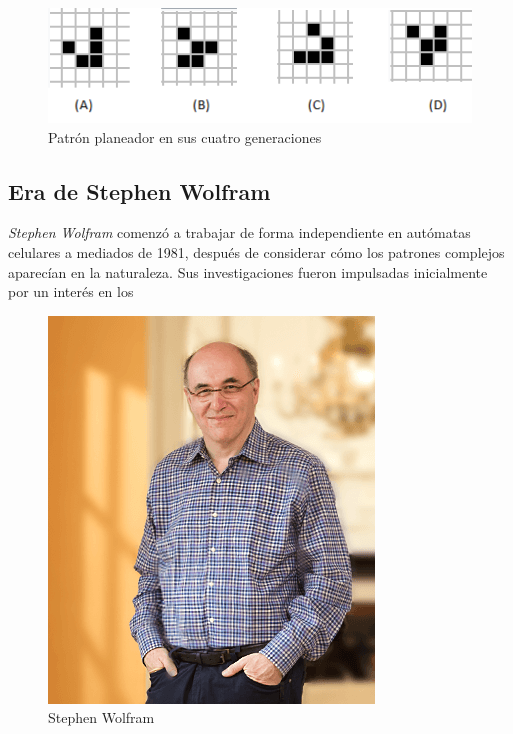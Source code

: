 \begin{figure}[H]
\centering
\includegraphics[scale=1]{imagenes/planeador.png}
\caption{Patrón planeador en sus cuatro generaciones}
\label{fig:planeador}
\end{figure}



\newpage
\subsection{Era de Stephen Wolfram} %
\textit{Stephen Wolfram} comenzó a trabajar de forma independiente en autómatas celulares a mediados de 1981, después de considerar cómo los patrones complejos aparecían en la naturaleza. Sus investigaciones fueron impulsadas inicialmente por un interés en los  
\begin{figure}
\centering
\includegraphics[scale=0.3]{imagenes/stephen.png}
\caption{Stephen Wolfram}
\label{fig:Stephen}
\end{figure}
